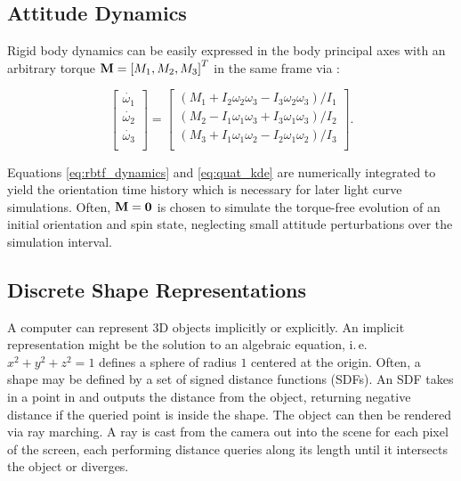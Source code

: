 \subsection{Attitude Dynamics}

Rigid body dynamics can be easily expressed in the body principal axes with an arbitrary torque $\mathbf{M} = \left[M_1, M_2, M_3\right]^T$ in the same frame via \cite{crassidis1ed}:

\begin{equation} \label{eq:rbtf_dynamics}
    \left[\begin{matrix}\dot{\omega_1}\\\dot{\omega_2}\\\dot{\omega_3}\\\end{matrix}\right]
    =
    \left[\begin{matrix}
        \left(M_1+I_2\omega_2\omega_3-I_3\omega_2\omega_3\right) / I_1 \\
        \left(M_2-I_1\omega_1\omega_3+I_3\omega_1\omega_3\right) / I_2 \\
        \left(M_3+I_1\omega_1\omega_2-I_2\omega_1\omega_2\right) / I_3 \\
    \end{matrix}\right].
\end{equation}

Equations \ref{eq:rbtf_dynamics} and \ref{eq:quat_kde} are numerically integrated to yield the orientation time history which is necessary for later light curve simulations. Often, $\mathbf{M} = \mathbf{0}$ is chosen to simulate the torque-free evolution of an initial orientation and spin state, neglecting small attitude perturbations over the simulation interval.

\subsection{Discrete Shape Representations}

A computer can represent 3D objects implicitly or explicitly. An implicit representation might be the solution to an algebraic equation, i.\,e.\, $x^2 + y^2 + z^2 = 1$ defines a sphere of radius $1$ centered at the origin. Often, a shape may be defined by a set of signed distance functions (SDFs). An SDF takes in a point in \rthree and outputs the distance from the object, returning negative distance if the queried point is inside the shape. The object can then be rendered via ray marching. A ray is cast from the camera out into the scene for each pixel of the screen, each performing distance queries along its length until it intersects the object or diverges. 

